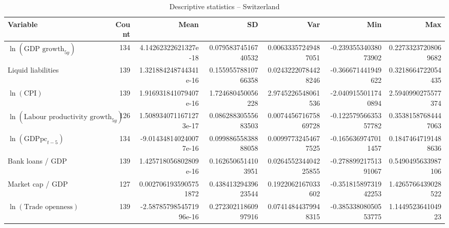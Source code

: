 \begin{table}[!htbp]
\centering
\caption{Descriptive statistics -- Switzerland}
\footnotesize
\begin{tabular}{lrrrrrr}
\toprule
Variable & Count & Mean & SD & Var & Min & Max \\
\midrule
$\ln(\text{GDP growth}_{5y})$ & 134 & 4.14262322621327e-18 & 0.07958374516740532 & 0.00633357249487051 & -0.23935534038073902 & 0.22733237208069682 \\
Liquid liabilities & 139 & 1.321884248744341e-16 & 0.15595578810766358 & 0.02432220784428246 & -0.366671441949622 & 0.3218664722054435 \\
$\ln(\text{CPI})$ & 139 & 1.916931841079407e-16 & 1.724680450056228 & 2.9745226548061536 & -2.0409155011740894 & 2.5940990275577374 \\
$\ln(\text{Labour productivity growth}_{5y})$ & 126 & 1.5089340711671273e-17 & 0.08628830555683503 & 0.007445671675869728 & -0.12257956635357782 & 0.35381587684447063 \\
$\ln(\text{GDPpc}_{t-5})$ & 134 & -9.014348140240077e-16 & 0.09988655838888058 & 0.00997732454677525 & -0.1656369747011457 & 0.18474647191488636 \\
Bank loans / GDP & 139 & 1.425718056802809e-16 & 0.1626506514103951 & 0.026455234404225855 & -0.27889921751391067 & 0.5490495633987106 \\
Market cap / GDP & 127 & 0.0027061935905751872 & 0.43841329439623544 & 0.1922062167033602 & -0.35181589731942253 & 1.4265766439028522 \\
$\ln(\text{Trade openness})$ & 139 & -2.5878579854571996e-16 & 0.27230211860997916 & 0.07414844379948315 & -0.38533808050553775 & 1.144952364104923 \\
\bottomrule
\end{tabular}
\end{table}


